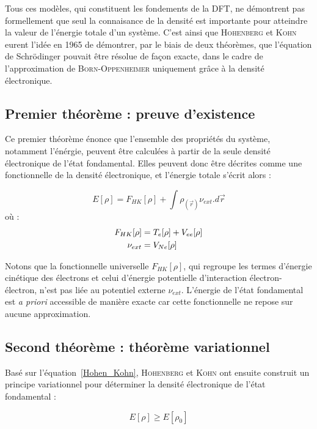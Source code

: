 Tous ces modèles, qui constituent les fondements de la DFT, ne démontrent pas formellement que seul la connaisance de la densité est importante pour atteindre la valeur de l'énergie totale d'un système. C'est ainsi que \textsc{Hohenberg} et \textsc{Kohn} eurent l'idée en 1965 de démontrer, par le biais de deux théorèmes, que l'équation de Schr\"{o}dinger pouvait être résolue de façon exacte, dans le cadre de l'approximation de \textsc{Born-Oppenheimer} uniquement grâce à la densité électronique.

\subsection{Premier théorème : preuve d'existence}

Ce premier théorème énonce que l'ensemble des propriétés du système, notamment l'énérgie, peuvent être calculées à partir de la seule densité électronique de l'état fondamental. Elles peuvent donc être décrites comme une fonctionnelle de la densité électronique, et l'énergie totale s'écrit alors :

\begin{equation}
E[\rho] = F_{HK}[\rho] + \int \rho_{(\vec{r})} \nu_{ext} .d\vec{r}
\label{Hohen_Kohn}
\end{equation}
\noindent où :
\begin{align}
F_{HK}[\rho] &= T_{e}[\rho] + V_{ee}[\rho] \\
\nu_{ext} &= V_{Ne}[\rho] \notag
\end{align}

Notons que la fonctionnelle universelle $F_{HK}[\rho]$, qui regroupe les termes d'énergie cinétique des électrons et celui d'énergie potentielle d'interaction électron-électron, n'est pas liée au potentiel externe $\nu_{ext}$. L'énergie de l'état fondamental est \textit{a priori} accessible de manière exacte car cette fonctionnelle ne repose sur aucune approximation.

\subsection{Second théorème : théorème variationnel}

Basé sur l'équation~\ref{Hohen_Kohn}, \textsc{Hohenberg} et \textsc{Kohn} ont ensuite construit un principe variationnel pour déterminer la densité électronique de l'état fondamental :

\begin{equation}
E[\rho] \geq E[\rho_{0}]
\end{equation}

